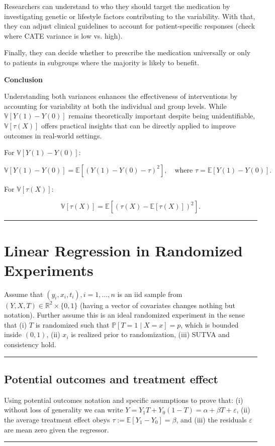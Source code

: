 \documentclass{article}
\newenvironment{colorparagraph}[1]{\par\color{#1}}{\par}
\begin{document}
Researchers can understand to who they should target the medication by investigating genetic or lifestyle factors contributing to the variability. With that, they can adjust clinical guidelines to account for patient-specific responses (check where CATE variance is low vs. high).

Finally, they can decide whether to prescribe the medication universally or only to patients in subgroups where the majority is likely to benefit.

\textbf{Conclusion}

Understanding both variances enhances the effectiveness of interventions by accounting for variability at both the individual and group levels. While \(\mathbb{V}[Y(1) - Y(0)]\) remains theoretically important despite being unidentifiable, \(\mathbb{V}[\tau(X)]\) offers practical insights that can be directly applied to improve outcomes in real-world settings.

For \(\mathbb{V}[Y(1) - Y(0)]\):

\[
\mathbb{V}[Y(1) - Y(0)] = \mathbb{E}\left[ \left( Y(1) - Y(0) - \tau \right)^2 \right], \quad \text{where } \tau = \mathbb{E}[Y(1) - Y(0)].
\]

For \(\mathbb{V}[\tau(X)]\):

\[
\mathbb{V}[\tau(X)] = \mathbb{E}\left[ \left( \tau(X) - \mathbb{E}[\tau(X)] \right)^2 \right].
\]

\newpage

\begin{colorparagraph}{questioncolor}
\rule{\textwidth}{0.5pt}

\label{q2}\section{Linear Regression in Randomized Experiments}

Assume that \((y_i, x_i, t_i), i = 1, \dots, n\) is an iid sample from \((Y, X, T) \in \mathbb{R}^2 \times \{0, 1\}\) (having a vector of covariates changes nothing but notation). Further assume this is an ideal randomized experiment in the sense that (i) \(T\) is randomized such that \(\mathbb{P}[T = 1 \mid X = x] = p\), which is bounded inside \((0, 1)\), (ii) \(x_i\) is realized prior to randomization, (iii) SUTVA and consistency hold.

\end{colorparagraph}

\begin{colorparagraph}{questioncolor}
\rule{\textwidth}{0.5pt}  

\label{q2a}\subsection{Potential outcomes and treatment effect}
Using potential outcomes notation and specific assumptions to prove that:
(i) without loss of generality we can write \(Y = Y_1 T + Y_0 (1 - T) = \alpha + \beta T + \varepsilon\),
(ii) the average treatment effect obeys \(\tau := \mathbb{E}[Y_1 - Y_0] = \beta\),
and (iii) the residuals \(\varepsilon\) are mean zero given the regressor.

\rule{\textwidth}{0.5pt}
\end{colorparagraph}
\end{document}
